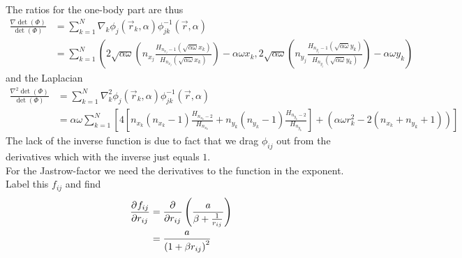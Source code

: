 \documentclass[a4paper, hidelinks, 10pt]{article}\usepackage[utf8]{inputenc}
\newcommand{\suml}[2]{\sum\limits_{#1=1}^{#2}}
\begin{document}
    The ratios for the one-body part are thus
        \begin{equation}
            \begin{aligned}
                \frac{\nabla\det(\Phi)}{\det(\Phi)} &= \suml{k}{N} \nabla_k
                \phi_j\left(\vec{r}_k,\alpha\right)
                \phi^{-1}_{jk}\left(\vec{r},\alpha\right) \\
                &= \suml{k}{N} \left(2\sqrt{\alpha\omega}
                \left(n_{x_j}\frac{H_{n_{x_j}-1}
                \left(\sqrt{\alpha\omega}x_k\right)}
                {H_{n_{x_j}}\left(\sqrt{\alpha\omega}x_k\right)}\right) -
                \alpha\omega x_k, 2\sqrt{\alpha\omega}
                \left(n_{y_j}\frac{H_{n_{y_j}-1}
                \left(\sqrt{\alpha\omega}y_k\right)}
                {H_{n_{y_j}}\left(\sqrt{\alpha\omega}y_k\right)}\right) -
                \alpha\omega y_k\right)
            \end{aligned}
            \label{eq:detderfirrat}
        \end{equation}
    and the Laplacian
        \begin{equation}
            \begin{aligned}
                \frac{\nabla^2\det(\Phi)}{\det(\Phi)} &= \suml{k}{N} \nabla^2_k
                \phi_j\left(\vec{r}_k,\alpha\right)
                \phi^{-1}_{jk}\left(\vec{r},\alpha\right) \\
                &= \alpha\omega\suml{k}{N} \left[4
                \left[n_{x_k}\left(n_{x_k}-1\right)
                \frac{H_{n_{x_k}-2}}{H_{n_{x_k}}} +
                n_{y_k}\left(n_{y_k}-1\right)
                \frac{H_{n_{y_k}-2}}{H_{n_{y_k}}}\right] +
                \left(\alpha \omega r_k^2 - 2\left(n_{x_k} +
                n_{y_k} + 1\right)\right)\right]
            \end{aligned}
            \label{eq:detdersecrat}
        \end{equation}
    The lack of the inverse function is due to fact that we drag $\phi_{ij}$
    out from the derivatives which with the inverse just equals $1$. \\
    For the Jastrow-factor we need the derivatives to the function in the
    exponent. Label this $f_{ij}$ and find
        \begin{align}
            \prd{r_{ij}}[f_{ij}] &= \prd{r_{ij}}\left(\frac{a}{\beta +
            \frac{1}{r_{ij}}}\right) \nonumber \\
            &= \frac{a}{\left(1+\beta r_{ij}\right)^2}
            \label{eq:gfijder1}
        \end{align}
\end{document}
